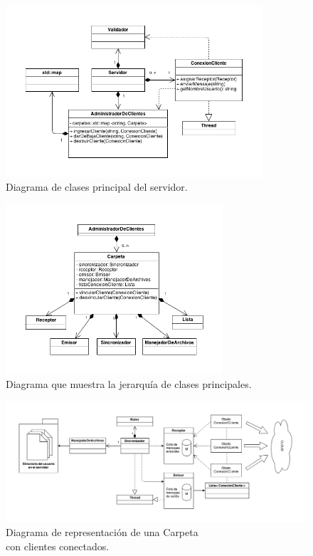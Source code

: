 \documentclass{article}
\begin{document}
\begin{figure}[h]
	\centering
	\includegraphics[width=0.85\textwidth]{images/Diagrama-modelo-servidor-parte1.png}
	\caption{Diagrama de clases principal del servidor.}
\end{figure}
\bigskip

\newpage

\begin{figure}[h]
	\centering
	\includegraphics[width=0.72\textwidth]{images/Diagrama-modelo-servidor-parte2.png}
	\caption{Diagrama que muestra la jerarquía de clases principales.}
\end{figure}
\bigskip


\begin{figure}[h]
	\centering
	\includegraphics[width=1.0\textwidth]{images/Diagrama-modelo-servidor-parte3.png}
	\caption{Diagrama de representación de una Carpeta\\ con clientes conectados.}
\end{figure}
\bigskip
\end{document}
